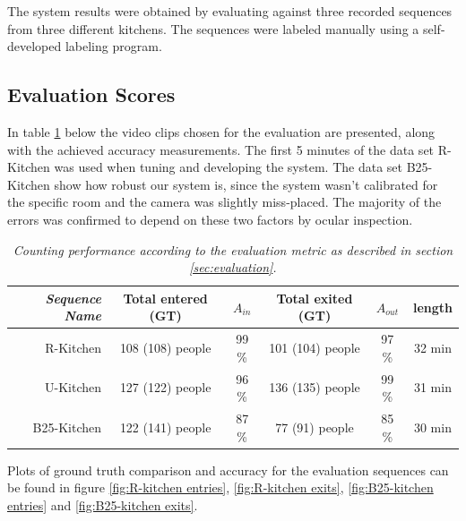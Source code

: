 The system results were obtained by evaluating against three recorded sequences from three different kitchens. The sequences were labeled manually using a self-developed labeling program.

\subsection{Evaluation Scores}
In table \ref{tab:evaluation_performance} below the video clips chosen for the evaluation are presented, along with the achieved accuracy measurements. The first 5 minutes of the data set R-Kitchen was used when tuning and developing the system. The data set B25-Kitchen show how robust our system is, since the system wasn't calibrated for the specific room and the camera was slightly miss-placed. The majority of the errors was confirmed to depend on these two factors by ocular inspection.

\begin{table}[h]
\centering
	\begin{tabular}{r | c | c | c | c | c  }
			\emph{Sequence Name}		&  Total entered (GT) & \emph{$A_{in}$} & Total exited (GT) & \emph{$A_{out}$} & length \\
			\hline \hline
			R-Kitchen			& 108 (108) people & 99 \% & 101 (104) people & 97 \% & 32 min\\
			U-Kitchen			& 127 (122) people & 96 \% & 136 (135) people & 99 \% & 31 min  \\
			B25-Kitchen			& 122 (141) people & 87 \% & 77 (91) people & 85 \% & 30 min \\
			\end{tabular}
	\caption[System performance]{\textit{Counting performance according to the evaluation metric as described in section \ref{sec:evaluation}.}}
	\label{tab:evaluation_performance}
\end{table}

Plots of ground truth comparison and accuracy for the evaluation sequences can be found in figure \ref{fig:R-kitchen entries}, \ref{fig:R-kitchen exits}, \ref{fig:B25-kitchen entries} and \ref{fig:B25-kitchen exits}.

